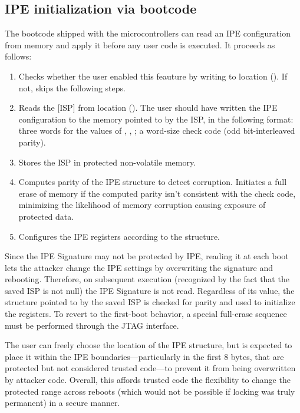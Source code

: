 \subsection{IPE initialization via bootcode}
\label{sec:bootcode}

The bootcode shipped with the \msp microcontrollers can read an IPE configuration from memory and apply it before any user code is executed.  It proceeds as follows:
\begin{enumerate}
\item Checks whether the user enabled this feauture by writing  to location  (). If not, skips the following steps.
\item Reads the [ISP] from location  (). The user should have written the IPE configuration to the memory pointed to by the ISP, in the following format: three words for the values of , , ; a word-size check code (odd bit-interleaved parity).
\item Stores the ISP in protected non-volatile memory.
\item Computes parity of the IPE structure to detect corruption. Initiates a full erase of memory if the computed parity isn't consistent with the check code, minimizing the likelihood of memory corruption causing exposure of protected data.
\item Configures the IPE registers according to the structure.
\end{enumerate}

Since the IPE Signature may not be protected by IPE, reading it at each boot lets the attacker change the IPE settings by overwriting the signature and rebooting. Therefore, on subsequent execution (recognized by the fact that the saved ISP is not null) the IPE Signature is not read. Regardless of its value, the structure pointed to by the saved ISP is checked for parity and used to initialize the registers.  To revert to the first-boot behavior, a special full-erase sequence must be performed through the JTAG interface.

The user can freely choose the location of the IPE structure, but is expected to place it within the IPE boundaries---particularly in the first 8 bytes, that are protected but not considered trusted code---to prevent it from being overwritten by attacker code. Overall, this affords trusted code the flexibility to change the protected range across reboots (which would not be possible if locking was truly permanent) in a secure manner.


